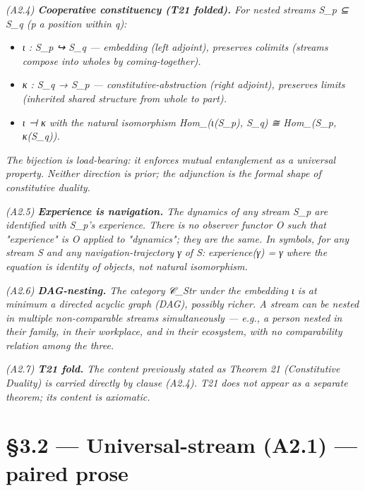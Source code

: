 \documentclass[11pt, openany]{book}
\newcommand{\sectionbreak}{\clearpage}
\begin{document}
\textit{(A2.4) \textbf{Cooperative constituency (T21 folded).} For nested streams S\_\allowbreak{}p ⊆ S\_\allowbreak{}q (p a position within q):}

\begin{itemize}
\item \textit{ι : S\_\allowbreak{}p ↪ S\_\allowbreak{}q --- embedding (left adjoint), preserves colimits (streams compose into wholes by coming-together).}
\item \textit{κ : S\_\allowbreak{}q → S\_\allowbreak{}p --- constitutive-abstraction (right adjoint), preserves limits (inherited shared structure from whole to part).}
\item \textit{ι ⊣ κ with the natural isomorphism Hom\_(ι(S\_\allowbreak{}p), S\_\allowbreak{}q) ≅ Hom\_(S\_\allowbreak{}p, κ(S\_\allowbreak{}q)).}
\end{itemize}

\textit{The bijection is load-bearing: it enforces mutual entanglement as a universal property. Neither direction is prior; the adjunction is the formal shape of constitutive duality.}

\textit{(A2.5) \textbf{Experience is navigation.} The dynamics of any stream S\_\allowbreak{}p are identified with S\_\allowbreak{}p's experience. There is no observer functor O such that "experience" is O applied to "dynamics"; they are the same. In symbols, for any stream S and any navigation-trajectory γ of S:}
\textit{experience(γ) = γ}
\textit{where the equation is identity of objects, not natural isomorphism.}

\textit{(A2.6) \textbf{DAG-nesting.} The category 𝒞\_\allowbreak{}Str under the embedding ι is at minimum a directed acyclic graph (DAG), possibly richer. A stream can be nested in multiple non-comparable streams simultaneously --- e.g., a person nested in their family, in their workplace, and in their ecosystem, with no comparability relation among the three.}

\textit{(A2.7) \textbf{T21 fold.} The content previously stated as Theorem 21 (Constitutive Duality) is carried directly by clause (A2.4). T21 does not appear as a separate theorem; its content is axiomatic.}

\sectionbreak

\section{§3.2 --- Universal-stream (A2.1) --- paired prose}
\end{document}
